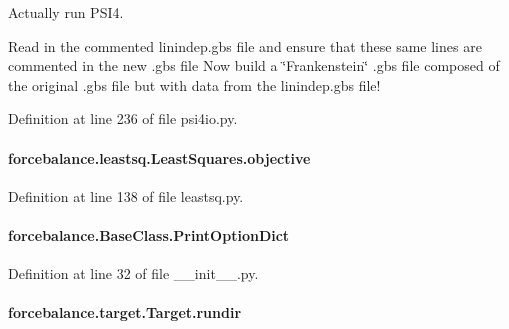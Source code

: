 Actually run P\-S\-I4. 

Read in the commented linindep.\-gbs file and ensure that these same lines are commented in the new .gbs file Now build a \char`\"{}\-Frankenstein\char`\"{} .gbs file composed of the original .gbs file but with data from the linindep.\-gbs file! 

Definition at line 236 of file psi4io.\-py.

\hypertarget{classforcebalance_1_1leastsq_1_1LeastSquares_a169fd8ca94e8f36539ec4ccfa0af4902}{
\paragraph[{objective}]{\setlength{\rightskip}{0pt plus 5cm}forcebalance.\-leastsq.\-Least\-Squares.\-objective\hspace{0.3cm}{\ttfamily [inherited]}}}\label{classforcebalance_1_1leastsq_1_1LeastSquares_a169fd8ca94e8f36539ec4ccfa0af4902}


Definition at line 138 of file leastsq.\-py.

\hypertarget{classforcebalance_1_1BaseClass_afc6659278497d7245bc492ecf405ccae}{
\paragraph[{Print\-Option\-Dict}]{\setlength{\rightskip}{0pt plus 5cm}forcebalance.\-Base\-Class.\-Print\-Option\-Dict\hspace{0.3cm}{\ttfamily [inherited]}}}\label{classforcebalance_1_1BaseClass_afc6659278497d7245bc492ecf405ccae}


Definition at line 32 of file \-\_\-\-\_\-init\-\_\-\-\_\-.\-py.

\hypertarget{classforcebalance_1_1target_1_1Target_a6872de5b2d4273b82336ea5b0da29c9e}{
\paragraph[{rundir}]{\setlength{\rightskip}{0pt plus 5cm}forcebalance.\-target.\-Target.\-rundir\hspace{0.3cm}{\ttfamily [inherited]}}}\label{classforcebalance_1_1target_1_1Target_a6872de5b2d4273b82336ea5b0da29c9e}


